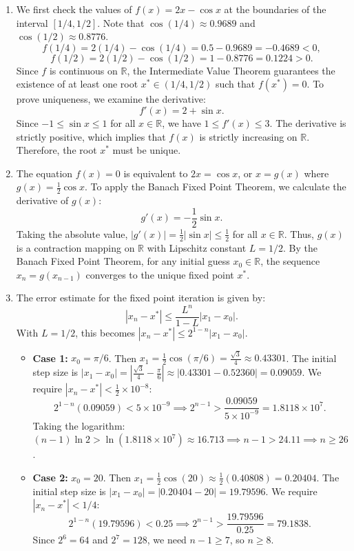 \begin{solution}
\begin{enumerate}
\item[(a)] We first check the values of $f(x) = 2x - \cos x$ at the boundaries of the interval $[1/4, 1/2]$. Note that $\cos(1/4) \approx 0.9689$ and $\cos(1/2) \approx 0.8776$.
\[
f(1/4) = 2(1/4) - \cos(1/4) = 0.5 - 0.9689 = -0.4689 < 0,
\]
\[
f(1/2) = 2(1/2) - \cos(1/2) = 1 - 0.8776 = 0.1224 > 0.
\]
Since $f$ is continuous on $\mathbb{R}$, the Intermediate Value Theorem guarantees the existence of at least one root $x^* \in (1/4, 1/2)$ such that $f(x^*) = 0$. To prove uniqueness, we examine the derivative:
\[
f'(x) = 2 + \sin x.
\]
Since $-1 \leq \sin x \leq 1$ for all $x \in \mathbb{R}$, we have $1 \leq f'(x) \leq 3$. The derivative is strictly positive, which implies that $f(x)$ is strictly increasing on $\mathbb{R}$. Therefore, the root $x^*$ must be unique.

\item[(b)] The equation $f(x) = 0$ is equivalent to $2x = \cos x$, or $x = g(x)$ where $g(x) = \frac{1}{2}\cos x$. To apply the Banach Fixed Point Theorem, we calculate the derivative of $g(x)$:
\[
g'(x) = -\frac{1}{2}\sin x.
\]
Taking the absolute value, $|g'(x)| = \frac{1}{2}|\sin x| \leq \frac{1}{2}$ for all $x \in \mathbb{R}$. Thus, $g(x)$ is a contraction mapping on $\mathbb{R}$ with Lipschitz constant $L = 1/2$. By the Banach Fixed Point Theorem, for any initial guess $x_0 \in \mathbb{R}$, the sequence $x_n = g(x_{n-1})$ converges to the unique fixed point $x^*$.

\item[(c)] The error estimate for the fixed point iteration is given by:
\[
|x_n - x^*| \leq \frac{L^n}{1-L} |x_1 - x_0|.
\]
With $L = 1/2$, this becomes $|x_n - x^*| \leq 2^{1-n} |x_1 - x_0|$.
\begin{itemize}
    \item \textbf{Case 1:} $x_0 = \pi/6$. Then $x_1 = \frac{1}{2}\cos(\pi/6) = \frac{\sqrt{3}}{4} \approx 0.43301$.
    The initial step size is $|x_1 - x_0| = |\frac{\sqrt{3}}{4} - \frac{\pi}{6}| \approx |0.43301 - 0.52360| = 0.09059$.
    We require $|x_n - x^*| < \frac{1}{2} \times 10^{-8}$:
    \[
    2^{1-n} (0.09059) < 5 \times 10^{-9} \implies 2^{n-1} > \frac{0.09059}{5 \times 10^{-9}} = 1.8118 \times 10^7.
    \]
    Taking the logarithm: $(n-1) \ln 2 > \ln(1.8118 \times 10^7) \approx 16.713 \implies n-1 > 24.11 \implies n \geq 26$.
    
    \item \textbf{Case 2:} $x_0 = 20$. Then $x_1 = \frac{1}{2}\cos(20) \approx \frac{1}{2}(0.40808) = 0.20404$.
    The initial step size is $|x_1 - x_0| = |0.20404 - 20| = 19.79596$.
    We require $|x_n - x^*| < 1/4$:
    \[
    2^{1-n} (19.79596) < 0.25 \implies 2^{n-1} > \frac{19.79596}{0.25} = 79.1838.
    \]
    Since $2^6 = 64$ and $2^7 = 128$, we need $n-1 \geq 7$, so $n \geq 8$.
\end{itemize}
\end{enumerate}
\end{solution}

